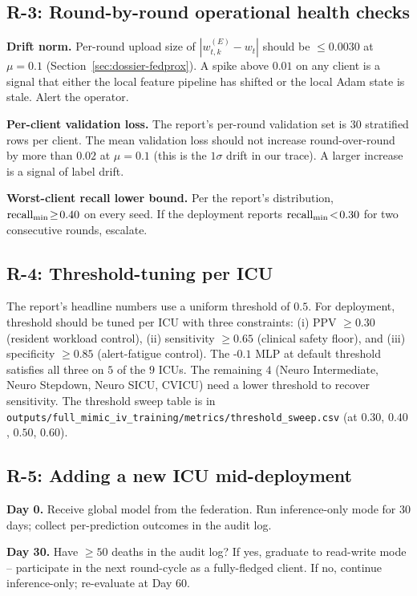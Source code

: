 \subsection{R-3: Round-by-round operational health checks}

\textbf{Drift norm.} Per-round upload size of $|w_{t,k}^{(E)} -
w_t|$ should be $\leq 0.0030$ at $\mu\!=\!0.1$
(Section~\ref{sec:dossier-fedprox}). A spike above $0.01$ on any
client is a signal that either the local feature pipeline has
shifted or the local Adam state is stale. Alert the operator.

\textbf{Per-client validation loss.} The report's per-round
validation set is $30$ stratified rows per client. The mean
validation loss should not increase round-over-round by more than
$0.02$ at $\mu\!=\!0.1$ (this is the $1\sigma$ drift in our
trace). A larger increase is a signal of label drift.

\textbf{Worst-client recall lower bound.} Per the report's
distribution, $\text{recall}_{\min}{}\!\geq\!0.40$ on every seed. If the
deployment reports $\text{recall}_{\min}{}\!<\!0.30$ for two consecutive
rounds, escalate.

\subsection{R-4: Threshold-tuning per ICU}

The report's headline numbers use a uniform threshold of $0.5$.
For deployment, threshold should be tuned per ICU with three
constraints: (i) PPV $\geq 0.30$ (resident workload control),
(ii) sensitivity $\geq 0.65$ (clinical safety floor), and (iii)
specificity $\geq 0.85$ (alert-fatigue control). The
\fedprox{}-$0.1$ MLP at default threshold satisfies all three on
$5$ of the $9$ ICUs. The remaining $4$ (Neuro Intermediate, Neuro
Stepdown, Neuro SICU, CVICU) need a lower threshold to recover
sensitivity. The threshold sweep table is in
\texttt{outputs/full\_mimic\_iv\_training/metrics/threshold\_sweep.csv}
(at $0.30$, $0.40$, $0.50$, $0.60$).

\subsection{R-5: Adding a new ICU mid-deployment}

\textbf{Day 0.} Receive global model from the federation. Run
inference-only mode for $30$ days; collect per-prediction outcomes
in the audit log.

\textbf{Day 30.} Have $\geq 50$ deaths in the audit log? If yes,
graduate to read-write mode -- participate in the next round-cycle
as a fully-fledged client. If no, continue inference-only;
re-evaluate at Day 60.

